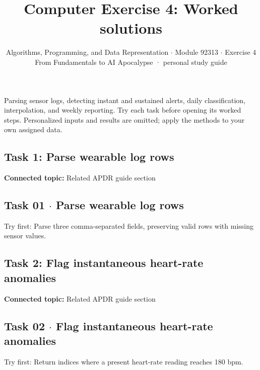 \documentclass[11pt]{article}
\title{\sffamily\bfseries\color{FAUblue}Computer Exercise 4: Worked solutions}
\author{Algorithms, Programming, and Data Representation \ensuremath{\cdot} Module 92313 \ensuremath{\cdot} Exercise 4\\[2pt]\small From Fundamentals to AI Apocalypse · personal study guide}
\date{}
\begin{document}
\maketitle
\begingroup\footnotesize\setlength{\parskip}{0pt}\tableofcontents\endgroup
\clearpage

{\large Parsing sensor logs, detecting instant and sustained alerts, daily classification, interpolation, and weekly reporting. Try each task before opening its worked steps. Personalized inputs and results are omitted; apply the methods to your own assigned data.}


\begin{keepsection}
\section{Task 1: Parse wearable log rows}

\textbf{Connected topic:} Related APDR guide section

\begin{keepsection}
\subsection{Task 01 \ensuremath{\cdot} Parse wearable log rows}

Try first: Parse three comma-separated fields, preserving valid rows with missing sensor values.

\end{keepsection}
\end{keepsection}

\begin{keepsection}
\section{Task 2: Flag instantaneous heart-rate anomalies}

\textbf{Connected topic:} Related APDR guide section

\begin{keepsection}
\subsection{Task 02 \ensuremath{\cdot} Flag instantaneous heart-rate anomalies}

Try first: Return indices where a present heart-rate reading reaches 180 bpm.

\end{keepsection}
\end{keepsection}
\end{document}
